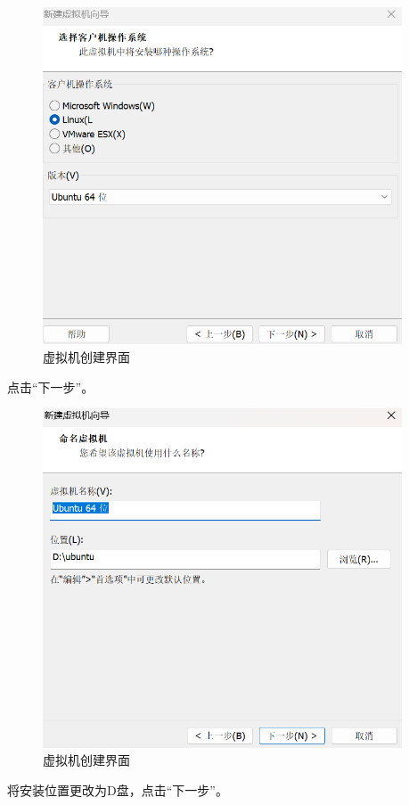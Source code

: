 \documentclass[UTF8]{ctexart}
\begin{document}
\begin{figure}[H]
    \centering
    \includegraphics[width=0.95\textwidth]{picture/Screenshot 2024-10-14 112814.png}
    \caption{虚拟机创建界面}
\end{figure}
点击“下一步”。

\begin{figure}[H]
    \centering
    \includegraphics[width=0.95\textwidth]{picture/Screenshot 2024-10-14 113001.png}
    \caption{虚拟机创建界面}
\end{figure}
将安装位置更改为D盘，点击“下一步”。
\end{document}
